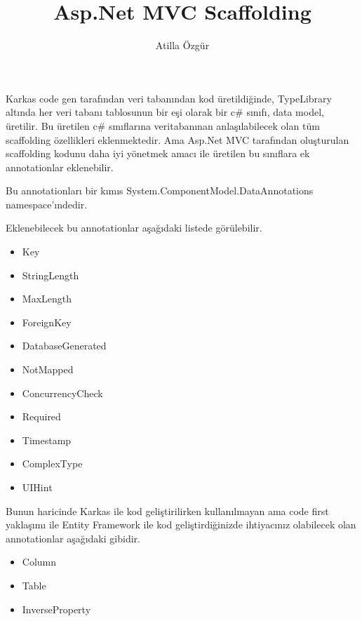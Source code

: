\documentclass[10pt,a4paper]{article}
\newcommand{\authorName}{Atilla \"Ozg\"ur}
\newcommand{\titleName}{Asp.Net MVC Scaffolding}
\begin{document}
\author{\authorName}
\title{\titleName}

\maketitle


\maketitle


Karkas code gen tarafından veri tabanından kod üretildiğinde,
TypeLibrary altında her veri tabanı tablosunun bir eşi olarak
bir c\# sınıfı, data model, üretilir. 
Bu üretilen c\# sınıflarına veritabanınan anlaşılabilecek olan
tüm scaffolding özellikleri eklenmektedir.
Ama Asp.Net MVC tarafından oluşturulan scaffolding kodunu
daha iyi yönetmek amacı ile üretilen
bu sınıflara ek annotationlar eklenebilir.

Bu annotationları bir kımıs System.ComponentModel.DataAnnotations namespace'ındedir.



Eklenebilecek bu annotationlar aşağıdaki listede \cite{Litwin2012} görülebilir.



\begin{itemize}

\item  Key

\item  StringLength

\item  MaxLength

\item ForeignKey

\item DatabaseGenerated

\item  NotMapped


\item  ConcurrencyCheck

\item  Required

\item  Timestamp

\item  ComplexType

\item  UIHint

\end{itemize}

Bunun haricinde Karkas ile kod geliştirilirken kullanılmayan
ama code first yaklaşımı ile Entity Framework ile kod
geliştirdiğinizde ihtiyacınız olabilecek olan
annotationlar aşağıdaki gibidir.


\begin{itemize}

\item  Column

\item Table

\item InverseProperty
\end{itemize}








% 

\end{document}
